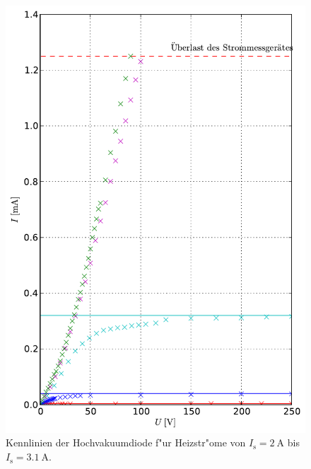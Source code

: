 		\begin{figure}[h!]
			\centering
			\includegraphics[width = 15cm]{img/kennlinie1.pdf}
			\caption{Kennlinien der Hochvakuumdiode f"ur Heizstr"ome von $I_\mathrm{s} = \SI{2}{\ampere}$ bis $I_\mathrm{s} = \SI{3.1}{\ampere}$.}
			\label{fig:kennlinie1}
		\end{figure}

